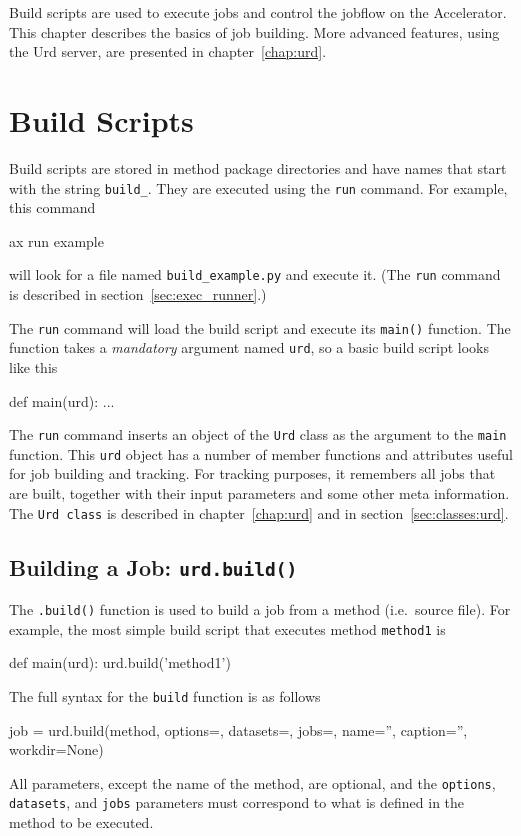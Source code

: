 \label{chap:urd_basic}

Build scripts are used to execute jobs and control the jobflow on the
Accelerator.  This chapter describes the basics of job building.  More
advanced features, using the Urd server, are presented in
chapter~\ref{chap:urd}.



\section{Build Scripts}
Build scripts are stored in method package directories and have names
that start with the string \texttt{build\_}.  They are executed using
the \texttt{run} command.  For example, this command
\begin{shell}
ax run example
\end{shell}
will look for a file named \texttt{build\_example.py} and execute it.
(The \texttt{run} command is described in
section~\ref{sec:exec_runner}.)

The \texttt{run} command will load the build script and execute
its \texttt{main()} function.  The function takes a \textsl{mandatory}
argument named \texttt{urd}, so a basic build script looks like this
\begin{python}
def main(urd):
    ...
\end{python}
The \texttt{run} command inserts an object of the \texttt{Urd} class
as the argument to the \texttt{main} function.  This \texttt{urd}
object has a number of member functions and attributes useful for job
building and tracking.  For tracking purposes, it remembers all jobs
that are built, together with their input parameters and some other
meta information.  The \texttt{Urd class} is described in
chapter~\ref{chap:urd} and in section~\ref{sec:classes:urd}.



\subsection{Building a Job: \texttt{urd.build()}}
The \texttt{.build()} function is used to build a job from a method
(i.e.\ source file).  For example, the most simple build script that
executes method \texttt{method1} is
\begin{python}
def main(urd):
    urd.build('method1')
\end{python}
The full syntax for the \texttt{build} function is as follows
\begin{python}
job = urd.build(method,
                options={}, datasets={}, jobs={},
                name='', caption='', workdir=None)
\end{python}
All parameters, except the name of the method, are optional, and
the \texttt{options}, \texttt{datasets}, and \texttt{jobs}
parameters must correspond to what is defined in the method to be
executed.

